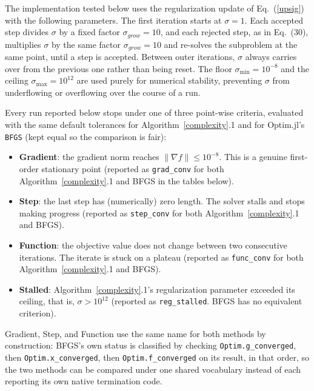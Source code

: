 \documentclass{article}
\begin{document}
The implementation tested below uses the regularization update of
Eq.~(\ref{upsig}) with the following parameters. The first iteration starts at
$\sigma = 1$. Each accepted step divides $\sigma$ by a fixed factor
$\sigma_{grow} = 10$, and each rejected step, as in Eq.~(30), multiplies
$\sigma$ by the same factor $\sigma_{grow} = 10$ and re-solves the
subproblem at the same point, until a step is accepted. Between outer
iterations, $\sigma$ always carries over from the previous one rather
than being reset. The floor $\sigma_{\min} = 10^{-8}$ and the ceiling
$\sigma_{\max} = 10^{12}$ are used purely for numerical stability,
preventing $\sigma$ from underflowing or overflowing over the course of a
run.

Every run reported below stops under one of three point-wise criteria,
evaluated with the same default tolerances for Algorithm~\ref{complexity}.1 and for
Optim.jl's \texttt{BFGS} \cite{Mogensen2018} (kept equal so the comparison
is fair):
\begin{itemize}
	\item \textbf{Gradient}: the gradient norm reaches $\|\nabla f\| \le 10^{-8}$. This is a genuine first-order stationary point (reported as \texttt{grad\_conv} for both Algorithm~\ref{complexity}.1 and BFGS in the tables below).
	\item \textbf{Step}: the last step has (numerically) zero length. The solver stalls and stops making progress (reported as \texttt{step\_conv} for both Algorithm~\ref{complexity}.1 and BFGS).
	\item \textbf{Function}: the objective value does not change between two consecutive iterations. The iterate is stuck on a plateau (reported as \texttt{func\_conv} for both Algorithm~\ref{complexity}.1 and BFGS).
	\item \textbf{Stalled}: Algorithm~\ref{complexity}.1's regularization parameter exceeded its
	ceiling, that is, $\sigma > 10^{12}$ (reported as \texttt{reg\_stalled}. BFGS has no equivalent criterion).
\end{itemize}
Gradient, Step, and Function use the same name for both methods by
construction: BFGS's own status is classified by checking
\texttt{Optim.g\_converged}, then \texttt{Optim.x\_converged}, then
\texttt{Optim.f\_converged} on its result, in that order, so the two
methods can be compared under one shared vocabulary instead of each
reporting its own native termination code.
\end{document}
